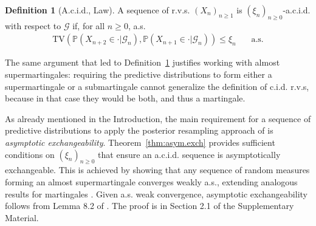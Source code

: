 \documentclass{article}
\theoremstyle{definition}
\newtheorem{definition}{Definition}
\renewcommand{\&}{and}
\begin{document}
\begin{definition}[A.c.i.d., Law] \label{def:acid.law}
    A sequence of r.v.s. $(X_{n})_{n\geq 1}$ is  $(\xi_{n})_{n\geq 0}$-a.c.i.d.  with respect to $\mathcal{G}$ if, for all $n\geq 0$, a.s.
    \begin{align*}
     \text{TV}\left(\mathbb{P}(X_{n+2} \in \cdot |\mathcal{G}_{n}),  \mathbb{P}(X_{n+1} \in \cdot |\mathcal{G}_{n}) \right) %
     \leq \xi_{n}  \ \ \ \ \ \ \ \ 
 \text{a.s.}
    \end{align*}
\end{definition}

The same argument that led to Definition~\ref{def:acid.law} justifies working with almost supermartingales:  requiring the predictive distributions to form either a supermartingale or a submartingale cannot generalize the definition of c.i.d. r.v.s, because in that case they would be both, and thus a martingale.

As already mentioned in the Introduction, the main requirement for a sequence of predictive distributions to apply the posterior resampling approach of \cite{fong2021martingale} is \textit{asymptotic exchangeability}. Theorem~\ref{thm:asym.exch} provides sufficient conditions on $(\xi_{n})_{n\geq 0}$ that ensure an a.c.i.d. sequence is asymptotically exchangeable. This is achieved by showing that any sequence of random measures forming an almost supermartingale converges weakly a.s., extending analogous results for martingales \citep[e.g. see][]{ald85,berti2004limit}. %
Given a.s. weak convergence, asymptotic exchangeability follows from Lemma 8.2 of \cite{ald85}.
The proof is in Section 2.1 of the Supplementary Material.
\end{document}
